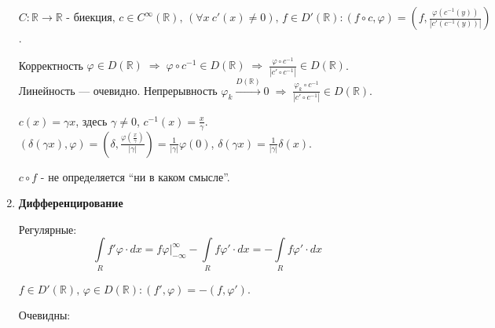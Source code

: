 \begin{enumerate}
  \begin{definition}

  \(C  \colon \mathbb{R}   \rightarrow  \mathbb{R}   \text{  -  биекция,  } c  \in  C^{\infty }  (\mathbb{R} )  \text{,  }  (\forall  x  \ c'(x)  \neq   0)  \text{,  } f  \in  D'  (\mathbb{R} )  \colon  (f  \circ  c, \varphi )  =  \left(f,  \frac{\varphi   \left(c^{-   1}  (y)\right)}{\left|c'  \left(c^{-   1}  (y)\right)\right|}\right)\).

  \end{definition}

  Корректность
  \(\varphi   \in  D  (\mathbb{R} )  \;  \Rightarrow   \; \varphi   \circ  c^{-   1}  \in  D  (\mathbb{R} )  \;  \Rightarrow   \;  \frac{\varphi   \circ  c^{-   1}}{\left|c'  \circ  c^{-   1}\right|}  \in  D  (\mathbb{R} )\).
  Линейность --- очевидно. Непрерывность
  \(\varphi _{k}  \xrightarrow{D  (\mathbb{R} )}  0  \;  \Rightarrow   \;  \frac{\varphi _{k}  \circ  c^{-   1}}{\left|c'  \circ  c^{-   1}\right|}  \in  D  (\mathbb{R} )\).

  \begin{example}

  \(c(x)  = \gamma  x\), здесь \(\gamma \neq 0\),
  \(c^{-   1}  (x)  =  \frac{x}{\gamma }\).
  \((\delta (\gamma  x), \varphi )  =  \left(\delta ,  \frac{\varphi   \left(\frac{x}{\gamma }\right)}{|\gamma |}\right)  =  \frac{1}{|\gamma |} \varphi   (0)\),
  \(\delta   (\gamma  x)  =  \frac{1}{|\gamma |} \delta   (x)\).

  \end{example}

  \begin{warning}

  \(c  \circ  f\) - не определяется ``ни в каком смысле''.

  \end{warning}
\item
  \textbf{Дифференцирование}

  Регулярные: \[
  \int\limits_R f'\varphi \cdot dx=f\varphi \Big|_{-\infty }^{\infty }-\int\limits_R f\varphi '\cdot dx=-\int\limits_R f\varphi '\cdot dx
  \]

  \begin{definition}

  \(f  \in  D'  (\mathbb{R} )  \text{,  } \varphi   \in  D  (\mathbb{R} )  \colon  (f', \varphi )  =  -   (f, \varphi ')\).

  \end{definition}

  Очевидны:


\end{enumerate}
